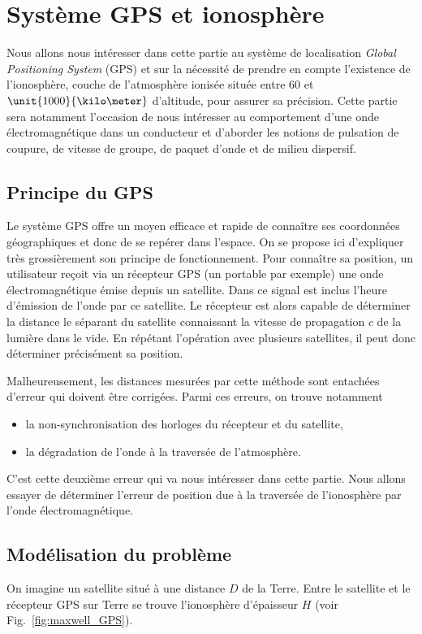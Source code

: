 \section{Système GPS et ionosphère}
Nous allons nous intéresser dans cette partie au système de localisation 
\emph{Global Positioning System} (GPS) et sur la nécessité de prendre en compte 
l'existence
de l'ionosphère, couche de l'atmosphère ionisée située entre $60$ et $\unit{1000}
{\kilo \meter}$ d'altitude, pour assurer sa précision. Cette partie sera notamment
l'occasion de nous intéresser au comportement d'une onde électromagnétique
dans un conducteur et d'aborder les notions de pulsation de coupure, 
de vitesse de groupe, de paquet d'onde et de milieu dispersif.

\subsection{Principe du GPS}
Le système GPS offre un moyen efficace et rapide de connaître ses coordonnées géographiques 
et donc de se repérer dans l'espace. On se propose ici d'expliquer très grossièrement 
son principe de fonctionnement. Pour connaître sa position, un utilisateur 
reçoit via un récepteur GPS (un portable par exemple) une onde électromagnétique
émise depuis un satellite. Dans ce signal est inclus l'heure d'émission de l'onde 
par ce satellite. Le récepteur est alors capable de déterminer la distance le séparant
du satellite connaissant la vitesse de propagation $c$ de la lumière dans le vide. 
En répétant l'opération avec plusieurs satellites, il peut donc déterminer précisément
sa position.

Malheureusement, les distances mesurées par cette méthode sont entachées d'erreur
qui doivent être corrigées. Parmi ces erreurs, on trouve notamment
\begin{itemize}
	\item la non-synchronisation des horloges du récepteur et du satellite,
	\item la dégradation de l'onde à la traversée de l'atmosphère.
\end{itemize}
C'est cette deuxième erreur qui va nous intéresser dans cette partie. Nous allons 
essayer de déterminer l'erreur de position due à la traversée de l'ionosphère 
par l'onde électromagnétique.

\subsection{Modélisation du problème}
On imagine un satellite situé à une distance $D$ de la Terre. Entre le satellite
et le récepteur GPS sur Terre se trouve l'ionosphère d'épaisseur $H$ 
(voir Fig.~\ref{fig:maxwell_GPS}). 

